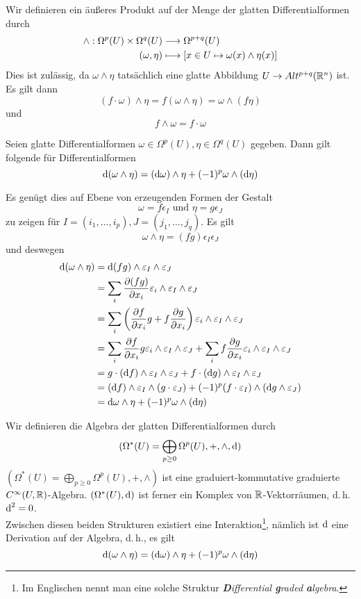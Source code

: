 \Def{}
Wir definieren ein äußeres Produkt auf der Menge der glatten Differentialformen durch
\begin{align*}
 \wedge : \Omega^p(U) \times \Omega^q(U) & \overset{{}}{\longrightarrow} \Omega^{p+q}(U)\\
 (\omega,\eta) & \longmapsto [x \in U \mapsto \omega(x)\wedge \eta(x)] 
\end{align*}
Dies ist zulässig, da $\omega\wedge \eta$ tatsächlich eine glatte Abbildung $U \overset{}{\rightarrow} Alt^{p+q}(\mathbb{R}^n)$ ist.\\
Es gilt dann
\[ (f\cdot \omega)\wedge \eta = f(\omega \wedge \eta) = \omega \wedge (f\eta) \]
und
\[ f\wedge \omega = f \cdot\omega\]

\Lem{}
Seien glatte Differentialformen $\omega\in \Omega^p(U), \eta \in \Omega^q(U)$ gegeben. Dann gilt folgende  für Differentialformen
\[ \text{d}(\omega \wedge \eta) = (\text{d} \omega) \wedge \eta +  (-1)^{p} \omega \wedge (\text{d} \eta) \]
\begin{Beweis}{}
Es genügt dies auf Ebene von erzeugenden Formen der Gestalt
\[ \omega = f\epsilon_I \text{ und } \eta = g\epsilon_J \]
zu zeigen für $I = (i_1,\ldots, i_p), J = (j_1, \ldots, j_q)$. Es gilt
\[ \omega \wedge \eta = (fg)\epsilon_I \epsilon_J \]
und deswegen
\begin{align*}
\text{d} (\omega \wedge \eta) &= \text{d} (fg) \wedge \varepsilon_I \wedge \varepsilon_J\\
&= \sum_{i} \frac{\partial (fg)}{\partial x_i} \varepsilon_i \wedge \varepsilon_I \wedge \varepsilon_J\\
&= \sum_{i} \left(\frac{\partial f}{\partial x_i} g + f \frac{\partial g}{\partial x_i}\right) \varepsilon_i \wedge \varepsilon_I \wedge \varepsilon_J\\
&= \sum_{i} \frac{\partial f}{\partial x_i} g  \varepsilon_i \wedge \varepsilon_I \wedge \varepsilon_J
+ \sum_{i} f\frac{\partial g}{\partial x_i}  \varepsilon_i \wedge \varepsilon_I \wedge \varepsilon_J\\
&=g \cdot (\text{d} f) \wedge \varepsilon_I \wedge \varepsilon_J +  f \cdot (\text{d} g) \wedge \varepsilon_I \wedge \varepsilon_J\\
&=(\text{d} f) \wedge \varepsilon_I \wedge (g \cdot \varepsilon_J) +  (-1)^p(f \cdot \varepsilon_I) \wedge (\text{d} g \wedge\varepsilon_J)\\
&= \text{d} \omega  \wedge \eta + (-1)^p\omega \wedge (\text{d} \eta)
\end{align*}
\end{Beweis}

\Def{}
Wir definieren die Algebra der glatten Differentialformen durch
\[ (\Omega^*(U) = \bigoplus_{p\geq 0} \Omega^p(U), +, \wedge, \text{d}) \]
$(\Omega^*(U) = \bigoplus_{p\geq 0} \Omega^p(U), +, \wedge)$ ist eine graduiert-kommutative graduierte $C^\infty(U,\mathbb{R})$-Algebra. $(\Omega^*(U),\text{d})$ ist ferner ein Komplex von $\mathbb{R}$-Vektorräumen, d.\,h. $\text{d}^2 = 0$.\\
Zwischen diesen beiden Strukturen existiert eine Interaktion\footnote{Im Englischen nennt man eine solche Struktur\textsl{ \textbf{D}ifferential \textbf{g}raded \textbf{a}lgebra}.}, nämlich ist $\text{d}$ eine Derivation auf der Algebra, d.\,h., es gilt
\[ \text{d}(\omega\wedge \eta) = (\text{d} \omega) \wedge \eta + (-1)^p \omega \wedge (\text{d} \eta) \]

